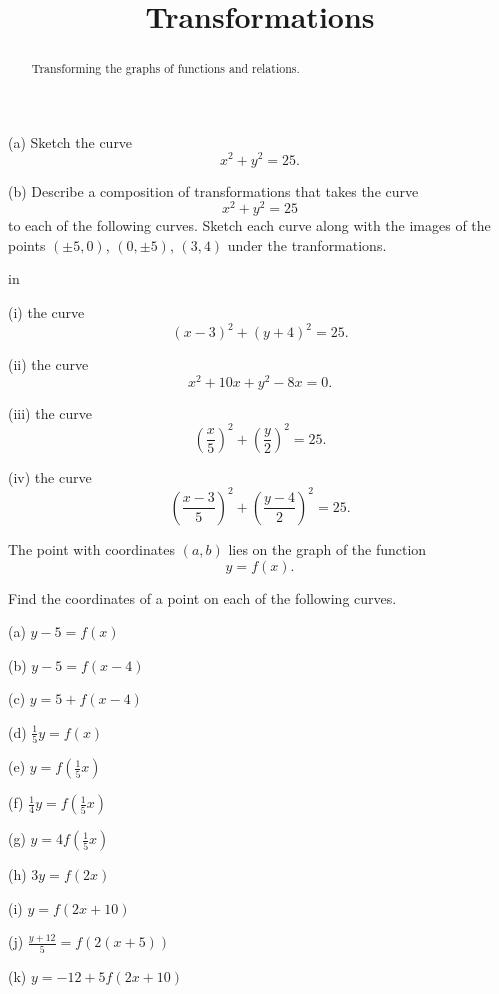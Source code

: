 \documentclass{ximera}
\title{Transformations}
\newcommand{\pskip}{\vskip 0.1 in}
\begin{document}
\begin{abstract}
Transforming the graphs of functions and relations.
\end{abstract}
\maketitle



\begin{question}  \label{Q:324bt44t}
(a) Sketch the curve
\[
    x^2 + y^2 = 25 .
\]

(b) Describe a composition of transformations that takes the curve
\[
        x^2 + y^2 = 25
\]
to each of the following curves. Sketch each curve along with the images of the points $(\pm 5,0)$, $(0,\pm 5)$, $(3,4)$ under the tranformations.

\pskip

(i) the curve
\[
          (x-3)^2 + (y+4)^2 = 25 .
\]

(ii)  the curve
\[
          x^2 +10x +y^2 - 8x = 0 .
\]

(iii) the curve
\[
       \left( \frac{x}{5} \right)^2 + \left( \frac{y}{2} \right)^2 = 25 .
\]

(iv) the curve
\[
       \left( \frac{x-3}{5} \right)^2 + \left( \frac{y-4}{2} \right)^2 = 25 .
\]

\end{question}


\begin{question}  \label{Q:3dd5r555234}
The point with coordinates $(a,b)$ lies on the graph of the function
\[
  y = f(x).
\]

Find the coordinates of a point on each of the following curves.

(a) $y - 5 = f(x)$

(b) $y - 5 = f(x-4)$

(c) $y= 5 + f(x-4)$

(d) $\frac{1}{5}y = f(x)$

(e) $y = f\left( \frac{1}{5} x \right)$

(f) $\frac{1}{4}y =  f\left( \frac{1}{5} x \right)$

(g) $y =  4  f\left( \frac{1}{5} x \right)$

(h) $3y = f(2x)$

(i) $y = f(2x+10)$

(j)  $\frac{y+12}{5} = f(2(x+5))$

(k) $y = -12 + 5 f(2x+10)$

\end{question}
\end{document}
